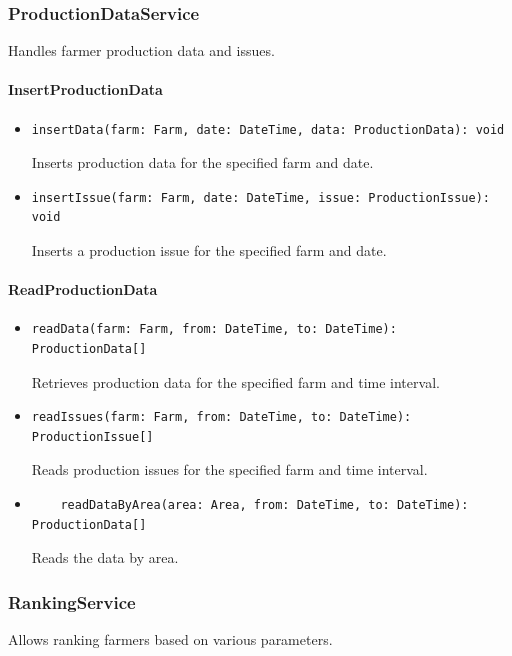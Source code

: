 \documentclass{article}
\begin{document}
\subsubsection{ProductionDataService}
Handles farmer production data and issues.

\paragraph{InsertProductionData}
\begin{itemize}
\item \begin{verbatim}
insertData(farm: Farm, date: DateTime, data: ProductionData): void
\end{verbatim}
Inserts production data for the specified farm and date.
\item \begin{verbatim}
insertIssue(farm: Farm, date: DateTime, issue: ProductionIssue): void
\end{verbatim}
Inserts a production issue for the specified farm and date.
\end{itemize}

\paragraph{ReadProductionData}
\begin{itemize}
\item \begin{verbatim}
readData(farm: Farm, from: DateTime, to: DateTime): ProductionData[]
\end{verbatim}
Retrieves production data for the specified farm and time interval.
\item \begin{verbatim}
readIssues(farm: Farm, from: DateTime, to: DateTime): ProductionIssue[]
\end{verbatim}
Reads production issues for the specified farm and time interval.

\item \begin{verbatim}
    readDataByArea(area: Area, from: DateTime, to: DateTime): ProductionData[]
\end{verbatim}
Reads the data by area.
\end{itemize}

\subsubsection{RankingService}
Allows ranking farmers based on various parameters.
\end{document}

